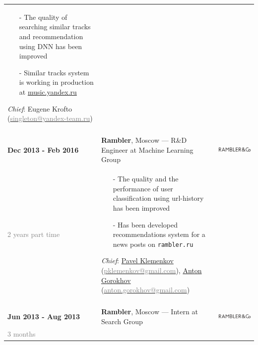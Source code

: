 \documentclass[a4paper,10pt]{article} %
\begin{document}
\begin{tabular}{l|p{11.5cm}c}
{  \vspace{-0.25cm}
  \begin{itemize}
      \item[-] The quality of searching similar tracks and recommendation using DNN has been improved
      \item[-] Similar tracks system is working in production at \url{music.yandex.ru} 
  \end{itemize}
\scriptsize{
	\emph{Chief}:  
	Eugene Krofto
	(\href{mailto:singleton@yandex-team.ru}{\textcolor{gray}{singleton@yandex-team.ru}})}
  \vspace{-0.1cm}
} & 
\\
\multicolumn{2}{c}{}\\

\textbf{Dec 2013 - Feb 2016} &  
\textbf{Rambler}, Moscow --- R\&D Engineer at Machine Learning Group  &
\multirow{1}{*}{\includegraphics[scale=0.1]{img/ramblerco}}\\ 
\textcolor{gray}{2 years part time}~~ &  \footnotesize{
  \vspace{-0.25cm}
  \begin{itemize}
      \item[-] The quality and the performance of user classification using url-history has been improved
  	  \item[-] Has been developed recommendations system for a news posts on \texttt{rambler.ru}
  \end{itemize}
	\scriptsize{
	\emph{Chief}:  
	\href{https://ru.linkedin.com/in/pavel-klemenkov-7a88a956}{Pavel Klemenkov} 
	(\href{mailto:pklemenkov@gmail.com}{\textcolor{gray}{pklemenkov@gmail.com}}),
	\href{https://ru.linkedin.com/in/anton-gorokhov-2959482}{Anton Gorokhov}
	(\href{mailto:anton.gorokhov@gmail.com}{\textcolor{gray}{anton.gorokhov@gmail.com}})}
  \vspace{-0.1cm}
} & 
\\
\multicolumn{2}{c}{}\\

\textbf{Jun 2013 - Aug 2013} & 
\textbf{Rambler}, Moscow --- Intern at Search Group&
\multirow{1}{*}{\includegraphics[scale=0.1]{img/ramblerco}}\\ 
\textcolor{gray}{3 months}& 
\footnotesize{

}
\end{tabular}
\end{document}
